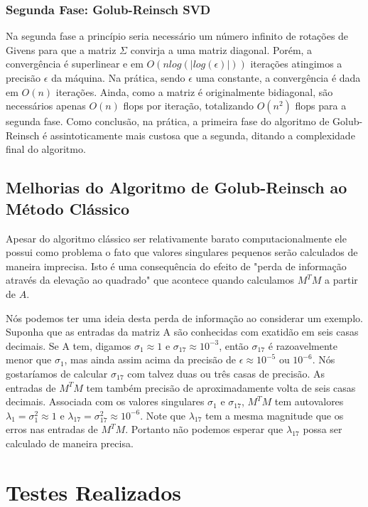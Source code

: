 \documentclass[brazil,times]{abnt}
\begin{document}
		\subsection{Segunda Fase: Golub-Reinsch SVD}
			Na segunda fase a princípio seria necessário um número infinito de rotações de Givens para que a matriz $\Sigma$ convirja a uma matriz diagonal. Porém, a convergência é superlinear e em $O(n log(|log(\epsilon)|))$ iterações atingimos a precisão $\epsilon$ da máquina. Na prática, sendo $\epsilon$ uma constante, a convergência é dada em $O(n)$ iterações. Ainda, como a matriz é originalmente bidiagonal, são necessários apenas $O(n)$ flops por iteração, totalizando $O(n^2)$ flops para a segunda fase. Como conclusão, na prática, a primeira fase do algoritmo de Golub-Reinsch é assintoticamente mais custosa que a segunda, ditando a complexidade final do algoritmo. \cite{trefethen}
			

	\section{Melhorias do Algoritmo de Golub-Reinsch ao Método Clássico\label{melhorias}}
		Apesar do algoritmo clássico ser relativamente barato computacionalmente ele possui como problema o fato que valores singulares pequenos serão calculados de maneira imprecisa. Isto é uma consequência do efeito de "perda de informação através da elevação ao quadrado" que acontece quando calculamos $M^{T}M$ a partir de $A$.
		
		Nós podemos ter uma ideia desta perda de informação ao considerar um exemplo. Suponha que as entradas da matriz A são conhecidas com exatidão em seis casas decimais. Se A tem, digamos $\sigma_1 \approx 1$ e $\sigma_{17} \approx 10^{-3}$, então $\sigma_{17}$ é razoavelmente menor que $\sigma_1$, mas ainda assim acima da precisão de $\epsilon \approx 10^{-5}$ ou $10^{-6}$. Nós gostaríamos de calcular $\sigma_17$ com talvez duas ou três casas de precisão. As entradas de $M^{T}M$ tem também precisão de aproximadamente volta de seis casas decimais. Associada com os valores singulares $\sigma_1$ e $\sigma_{17}$, $M^{T}M$ tem autovalores $\lambda_1 = \sigma_{1}^{2} \approx 1$ e $\lambda_{17} = \sigma_{17}^{2} \approx 10^{-6}$. Note que $\lambda_{17}$ tem a mesma magnitude que os erros nas entradas de $M^{T}M$. Portanto não podemos esperar que $\lambda_{17}$ possa ser calculado de maneira precisa. \cite{watkins2004fundamentals}
	
	
\chapter{Testes Realizados}
\end{document}
